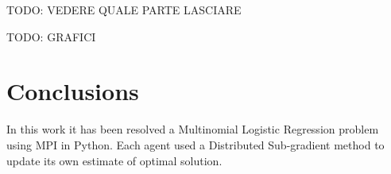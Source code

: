 \documentclass[a4paper,11pt,oneside]{book}
\begin{document}
TODO: VEDERE QUALE PARTE LASCIARE

TODO: GRAFICI

\chapter*{Conclusions} %
In this work it has been resolved a Multinomial Logistic Regression problem using MPI in Python. Each agent used a Distributed Sub-gradient method to update its own estimate of optimal solution.


{}
	
\end{document}
